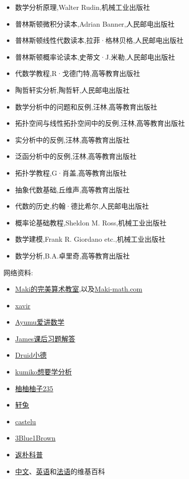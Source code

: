 \documentclass[12pt, a4paper, oneside]{ctexbook}
\begin{document}
\begin{itemize}
  \item 数学分析原理,Walter Rudin,机械工业出版社
  \item 普林斯顿微积分读本,Adrian Banner,人民邮电出版社
  \item 普林斯顿线性代数读本,拉菲·格林贝格,人民邮电出版社
  \item 普林斯顿概率论读本,史蒂文·J.米勒,人民邮电出版社
  \item 代数学教程,R·戈德门特,高等教育出版社
  \item 陶哲轩实分析,陶哲轩,人民邮电出版社
  \item 数学分析中的问题和反例,汪林,高等教育出版社
  \item 拓扑空间与线性拓扑空间中的反例,汪林,高等教育出版社
  \item 实分析中的反例,汪林,高等教育出版社
  \item 泛函分析中的反例,汪林,高等教育出版社
  \item 拓扑学教程,G·肖盖,高等教育出版社
  \item 抽象代数基础,丘维声,高等教育出版社
  \item 代数的历史,约翰·德比希尔,人民邮电出版社
  \item 概率论基础教程,Sheldon M. Ross,机械工业出版社
  \item 数学建模,Frank R. Giordano etc.,机械工业出版社
  \item 数学分析,B.A.卓里奇,高等教育出版社
\end{itemize}
网络资料:
\begin{itemize}
  \item \href{https://space.bilibili.com/391930545}{Maki的完美算术教室},以及\href{https://www.maki-math.com/#/}{Maki-math.com}
  \item \href{https://www.zhihu.com/people/xavir-79/posts}{xavir}
  \item \href{https://space.bilibili.com/1632276842}{Ayumu爱讲数学}
  \item \href{https://space.bilibili.com/29977151}{James课后习题解答}
  \item \href{https://space.bilibili.com/6073855}{Druid小德}
  \item \href{https://space.bilibili.com/3156848}{kumiko想要学分析}
  \item \href{https://space.bilibili.com/586867165}{柚柚柚子235}
  \item \href{https://space.bilibili.com/20883932}{轩兔}
  \item \href{https://space.bilibili.com/184538069}{castelu}
  \item \href{https://space.bilibili.com/88461692}{3Blue1Brown}
  \item \href{https://space.bilibili.com/415941398}{返朴科普}
  \item \href{https://zh.wikipedia.org/wiki/Wikipedia:%E9%A6%96%E9%A1%B5}{中文}、\href{https://en.wikipedia.org/wiki/Main_Page}{英语}和\href{https://fr.wikipedia.org/wiki/Wikip%C3%A9dia:Accueil_principal}{法语}的维基百科
\end{itemize}
\end{document}

